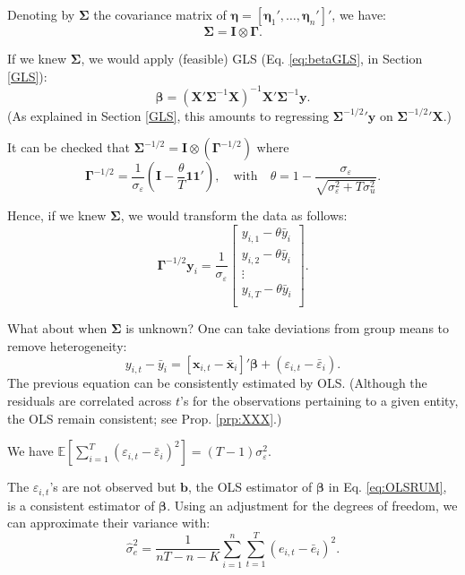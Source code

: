 \documentclass[
  12pt,
]{book}
\theoremstyle{definition}
\theoremstyle{definition}
\theoremstyle{definition}
\theoremstyle{definition}
\theoremstyle{remark}
\begin{document}
Denoting by \(\boldsymbol\Sigma\) the covariance matrix of \(\boldsymbol\eta = [\boldsymbol\eta_1',\dots,\boldsymbol\eta_n']'\), we have:
\[
\boldsymbol\Sigma = \mathbf{I} \otimes \boldsymbol\Gamma.
\]

If we knew \(\boldsymbol\Sigma\), we would apply (feasible) GLS (Eq. \eqref{eq:betaGLS}, in Section \ref{GLS}):
\[
\boldsymbol\beta = (\mathbf{X}'\boldsymbol\Sigma^{-1}\mathbf{X})^{-1}\mathbf{X}'\boldsymbol\Sigma^{-1}\mathbf{y}.
\]
(As explained in Section \ref{GLS}, this amounts to regressing \({\boldsymbol\Sigma^{-1/2}}'\mathbf{y}\) on \({\boldsymbol\Sigma^{-1/2}}'\mathbf{X}\).)

It can be checked that \(\boldsymbol\Sigma^{-1/2} = \mathbf{I} \otimes (\boldsymbol\Gamma^{-1/2})\) where
\[
\boldsymbol\Gamma^{-1/2} = \frac{1}{\sigma_\varepsilon}\left( \mathbf{I} - \frac{\theta}{T}\mathbf{1}\mathbf{1}'\right),\quad \mbox{with}\quad\theta = 1 - \frac{\sigma_\varepsilon}{\sqrt{\sigma_\varepsilon^2+T\sigma_u^2}}.
\]

Hence, if we knew \(\boldsymbol\Sigma\), we would transform the data as follows:
\[
\boldsymbol\Gamma^{-1/2}\mathbf{y}_i = \frac{1}{\sigma_\varepsilon}\left[\begin{array}{c}y_{i,1} - \theta\bar{y}_i\\y_{i,2} - \theta\bar{y}_i\\\vdots\\y_{i,T} - \theta\bar{y}_i\\\end{array}\right].
\]

What about when \(\boldsymbol\Sigma\) is unknown? One can take deviations from group means to remove heterogeneity:
\begin{equation}
y_{i,t} - \bar{y}_i = [\mathbf{x}_{i,t} - \bar{\mathbf{x}}_i]'\boldsymbol\beta + (\varepsilon_{i,t} - \bar{\varepsilon}_i).\label{eq:OLSRUM}
\end{equation}
The previous equation can be consistently estimated by OLS. (Although the residuals are correlated across \(t\)'s for the observations pertaining to a given entity, the OLS remain consistent; see Prop. \ref{prp:XXX}.)

We have \(\mathbb{E}\left[\sum_{i=1}^{T}(\varepsilon_{i,t}-\bar{\varepsilon}_i)^2\right] = (T-1)\sigma_{\varepsilon}^2\).

The \(\varepsilon_{i,t}\)'s are not observed but \(\mathbf{b}\), the OLS estimator of \(\boldsymbol\beta\) in Eq. \eqref{eq:OLSRUM}, is a consistent estimator of \(\boldsymbol\beta\). Using an adjustment for the degrees of freedom, we can approximate their variance with:
\[
\hat{\sigma}_e^2 = \frac{1}{nT-n-K}\sum_{i=1}^{n}\sum_{t=1}^{T}(e_{i,t} - \bar{e}_i)^2.
\]
\end{document}
